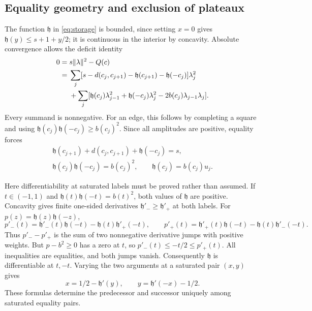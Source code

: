 \subsection{Equality geometry and exclusion of plateaux}
The function \(\mathfrak h\) in \eqref{eq:storage} is bounded, since setting
\(x=0\) gives \(\mathfrak h(y)\le s+1+y/2\); it is continuous in the interior
by concavity. Absolute convergence allows the deficit identity
\begin{align}
 0={}&s\|\lambda\|^2-Q(c)\label{eq:deficits}\\
 ={}&\sum_j[s-d(c_j,c_{j+1})-\mathfrak h(c_{j+1})-\mathfrak h(-c_j)]\lambda_j^2\notag\\
 &+\sum_j[\mathfrak h(c_j)\lambda_{j-1}^2+\mathfrak h(-c_j)\lambda_j^2
                  -2b(c_j)\lambda_{j-1}\lambda_j].\notag
\end{align}
Every summand is nonnegative. For an edge, this follows by completing
a square and using \(\mathfrak h(c_j)\mathfrak h(-c_j)\ge b(c_j)^2\). Since all amplitudes
are positive, equality forces
\begin{equation}\label{eq:saturation}
 \begin{gathered}
 \mathfrak h(c_{j+1})+d(c_j,c_{j+1})+\mathfrak h(-c_j)=s,\\
 \mathfrak h(c_j)\mathfrak h(-c_j)=b(c_j)^2,\qquad \mathfrak h(c_j)=b(c_j)u_j .
 \end{gathered}
\end{equation}

Here differentiability at saturated labels must be proved rather than
assumed. If \(t\in(-1,1)\) and \(\mathfrak h(t)\mathfrak h(-t)=b(t)^2\), both values of
\(\mathfrak h\) are positive. Concavity gives finite one-sided derivatives
\(\mathfrak h'_-\ge \mathfrak h'_+\) at both labels. For \(p(z)=\mathfrak h(z)\mathfrak h(-z)\),
\[
 p'_-(t)=\mathfrak h'_-(t)\mathfrak h(-t)-\mathfrak h(t)\mathfrak h'_+(-t),\qquad
 p'_+(t)=\mathfrak h'_+(t)\mathfrak h(-t)-\mathfrak h(t)\mathfrak h'_-(-t).
\]
Thus \(p'_--p'_+\) is the sum of two nonnegative derivative jumps
with positive weights. But \(p-b^2\ge0\) has a zero at \(t\), so
\(p'_-(t)\le-t/2\le p'_+(t)\). All inequalities are equalities, and
both jumps vanish. Consequently \(\mathfrak h\) is differentiable at \(t,-t\).
Varying the two arguments at a saturated pair \((x,y)\) gives
\begin{equation}\label{eq:predsucc}
 x=1/2-\mathfrak h'(y),\qquad y=\mathfrak h'(-x)-1/2.
\end{equation}
These formulas determine the predecessor and successor uniquely
among saturated equality pairs.

